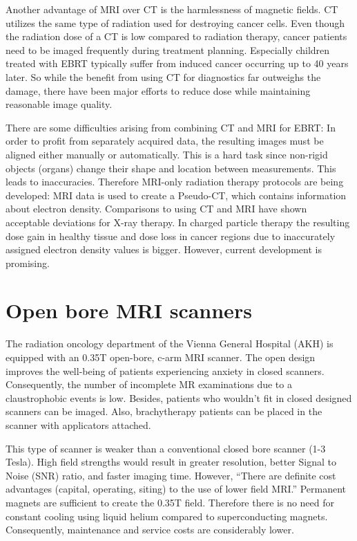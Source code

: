 Another advantage of MRI over CT is the harmlessness of magnetic fields. CT utilizes the same type of radiation used for destroying cancer cells. Even though the radiation dose of a
CT is low compared to radiation therapy, cancer patients need to be imaged frequently during treatment planning. Especially children treated with EBRT typically
suffer from induced cancer occurring up to 40 years later. So while the benefit from using CT for diagnostics far outweighs the damage, there have been major efforts to
reduce dose while maintaining reasonable image quality. \cite{Murphy2007, Brenner2001, Sodickson2009, Smith2007, McCollough2009, Goldman2013}

There are some difficulties arising from combining CT and MRI for EBRT:
In order to profit from separately acquired data, the resulting images must be aligned either manually or automatically. This is a hard task since non-rigid objects (organs) change their shape and location between measurements. This leads to inaccuracies.
Therefore MRI-only radiation therapy protocols are being developed:
MRI data is used to create a Pseudo-CT, which contains information about electron density. Comparisons to using CT and MRI have shown acceptable deviations for X-ray therapy.
In charged particle therapy the resulting dose gain in healthy tissue and dose loss in cancer regions due to inaccurately assigned electron density values is bigger.
However, current development is promising. \cite{Rank2013, Stanescu2006, Nyholm2015, Greer2015, Chen2004}

\section{Open bore MRI scanners}

The radiation oncology department of the Vienna General Hospital (AKH) is equipped with an 0.35T open-bore, c-arm MRI scanner. The open design improves the well-being of patients
experiencing anxiety in closed scanners. Consequently, the number of incomplete MR examinations due to a claustrophobic events is low. \cite{Enders2011a, Bangard2007}
Besides, patients who wouldn't fit in closed designed scanners can be imaged.
Also, brachytherapy patients can be placed in the scanner with applicators attached.

This type of scanner is weaker than a conventional closed bore scanner (1-3 Tesla). High field strengths would result in greater resolution, better Signal to Noise (SNR) ratio, and faster imaging time.
However, ``There are definite cost advantages (capital, operating, siting) to the use of lower field MRI.'' \cite{Rutt1996}
Permanent magnets are sufficient to create the 0.35T field. Therefore there is no need for constant cooling using liquid helium compared to superconducting magnets.
Consequently, maintenance and service costs are considerably lower.

